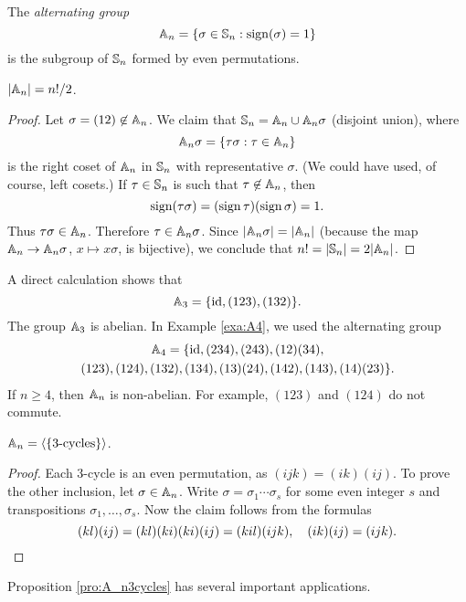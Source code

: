 \begin{definition}   
The \emph{alternating group}
\[
\mathbb{A}_n=\{\sigma\in\mathbb{S}_n:\operatorname{sign}(\sigma)=1\}
\]
is the subgroup of $\mathbb{S}_n$ formed by even permutations. 
\end{definition}

\begin{proposition}
$|\mathbb{A}_n|=n!/2$.
\end{proposition}

\begin{proof}
Let $\sigma=(12)\not\in\mathbb{A}_n$. We claim that 
$\mathbb{S}_n=\mathbb{A}_n\cup\mathbb{A}_n\sigma$ (disjoint union), where 
\[
\mathbb{A}_n\sigma=\{\tau\sigma:\tau\in\mathbb{A}_n\}
\]
is the right coset of $\mathbb{A}_n$ in $\mathbb{S}_n$ with 
representative $\sigma$. (We could have used, of course, left cosets.)
If 
$\tau\in\mathbb{S}_n$ is such that $\tau\not\in\mathbb{A}_n$, then 
\[
\operatorname{sign}(\tau\sigma)=(\operatorname{sign}\tau)(\operatorname{sign}\sigma)=1.
\]
Thus 
$\tau\sigma\in\mathbb{A}_n$. Therefore $\tau\in\mathbb{A}_n\sigma$. Since  $|\mathbb{A}_n\sigma|=|\mathbb{A}_
n|$ (because the map $\mathbb{A}_n\to\mathbb{A}_n\sigma$, $x\mapsto x\sigma$, is bijective), we conclude that 
$n!=|\mathbb{S}_n|=2|\mathbb{A}_n|$.
\end{proof}

A direct calculation shows that  
\[
\mathbb{A}_3=\{\operatorname{id},(123),(132)\}.
\]
The group $\mathbb{A}_3$ is abelian.
In Example \ref{exa:A4}, we used the alternating group 
\begin{multline*}
\mathbb{A}_4=\{\operatorname{id},(234),(243),(12)(34),\\(123),(124),(132),(134),(13)(24),(142),(143),(14)(23)\}.
\end{multline*}
If $n\geq4$, then $\mathbb{A}_n$ is non-abelian. For example, 
$(123)$ and $(124)$ do not commute. 

\begin{proposition}
\label{pro:A_n3cycles}
$\mathbb{A}_n=\langle\{\text{3-cycles}\}\rangle$.
\end{proposition}

\begin{proof}
Each 3-cycle is an even permutation, as $(ijk)=(ik)(ij)$. 
To prove the other inclusion, let $\sigma\in\mathbb{A}_n$.
Write $\sigma=\sigma_1\cdots\sigma_s$ for some even integer $s$ 
and transpositions $\sigma_1,\dots,\sigma_s$. 
Now the claim follows from the formulas 
\[
(kl)(ij)=(kl)(ki)(ki)(ij)=(kil)(ijk),\quad
(ik)(ij)=(ijk).\qedhere
\]
 \end{proof}

Proposition \ref{pro:A_n3cycles} has several 
important applications. 

